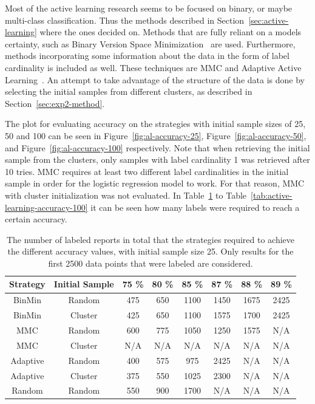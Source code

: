 Most of the active learning research seems to be focused on binary, or maybe multi-class classification.
Thus the methods described in Section~\ref{sec:active-learning} where the ones decided on.
Methods that are fully reliant on a models certainty, such as Binary Version Space Minimization~\cite{brinker2006active} are used.
Furthermore, methods incorporating some information about the data in the form of label cardinality is included as well.
These techniques are MMC and Adaptive Active Learning~\cite{yang2009effective, li2013active}.
An attempt to take advantage of the structure of the data is done by selecting the initial samples from different clusters, as described in Section~\ref{sec:exp2-method}.

The plot for evaluating accuracy on the strategies with initial sample sizes of 25, 50 and 100 can be seen in Figure~\ref{fig:al-accuracy-25}, Figure~\ref{fig:al-accuracy-50}, and Figure~\ref{fig:al-accuracy-100} respectively.
Note that when retrieving the initial sample from the clusters, only samples with label cardinality 1 was retrieved after 10 tries.
MMC requires at least two different label cardinalities in the initial sample in order for the logistic regression model to work.
For that reason, MMC with cluster initialization was not evaluated.
In Table~\ref{tab:active-learning-accuracy-25} to Table~\ref{tab:active-learning-accuracy-100} it can be seen how many labels were required to reach a certain accuracy.


\begin{table}
    \centering
    \begin{tabular}{|cccccccc|}
        \hline
        \textbf{Strategy} & \textbf{Initial Sample} & \textbf{75 \%} & \textbf{80 \%} & \textbf{85 \%} & \textbf{87 \%} & \textbf{88 \%} & \textbf{89 \%}\\
        \hline
        BinMin & Random & 475 & 650 & 1100 & 1450 & 1675 & 2425\\
        BinMin & Cluster & 425 & 650 & 1100 & 1575 & 1700 & 2425\\
        MMC & Random & 600 & 775 & 1050 & 1250 & 1575 & N/A\\
        MMC & Cluster & N/A & N/A & N/A & N/A & N/A & N/A\\
        Adaptive & Random & 400 & 575 & 975 & 2425 & N/A & N/A\\
        Adaptive & Cluster & 375 & 550 & 1025 & 2300 & N/A & N/A\\
        Random & Random & 550 & 900 & 1700 & N/A & N/A & N/A\\
        \hline
    \end{tabular}
    \caption{The number of labeled reports in total that the strategies required to achieve the different accuracy values, with initial sample size 25. Only results for the first 2500 data points that were labeled are considered.}
    \label{tab:active-learning-accuracy-25}
\end{table}

